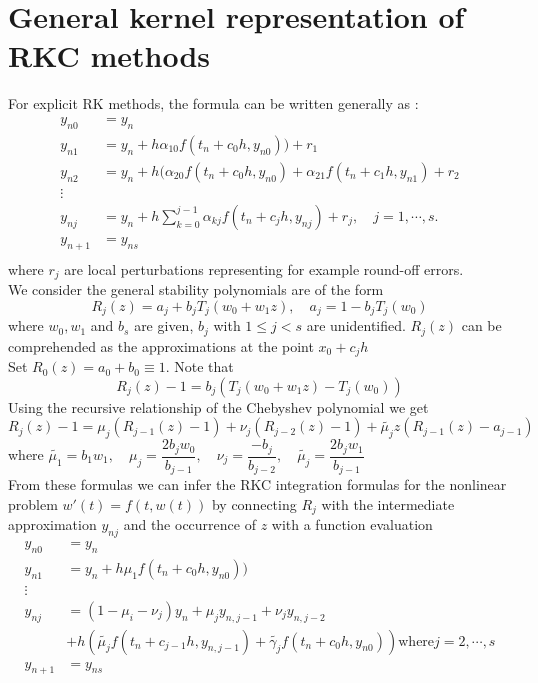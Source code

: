 \documentclass{article}
\theoremstyle{theorem}
\theoremstyle{definition}
\begin{document}
\section{General kernel representation of RKC methods}
For explicit RK methods, the formula can be written generally  as : $$ \begin{aligned}
y_{n0}&=y_n\\ 
y_{n1}&=y_n + h \alpha_{10}f(t_n+c_0h,y_{n0}))+r_1\\ 
y_{n2}&=y_n + h (\alpha_{20}f(t_n+c_0h,y_{n0})+\alpha_{21}f(t_n+c_1h,y_{n1})+r_2\\ 
\vdots \\
y_{nj}&=y_n + h \sum_{k=0}^{j-1}\alpha_{kj}f(t_n+c_jh,y_{nj})+r_j ,\quad j=1,\cdots, s. \\
y_{n+1}&=y_{ns}\\ 
\end{aligned}$$
where $r_j$ are local perturbations representing for example round-off errors.\\
We consider the general stability polynomials are of the form
$$R_j(z)=a_j+b_jT_j(w_0+w_1z), \quad a_j=1-b_jT_j(w_0)$$ where $w_0,w_1$ and $b_s$ are given, $b_j$ with $1 \le j < s$ are unidentified. $R_j(z)$ can be comprehended as the approximations at the point $x_0+c_jh$\\ Set $R_0(z)=a_0+b_0 \equiv 1$. 
Note that $$R_j(z)-1=b_j(T_j(w_0+w_1z)-T_j(w_0))$$
Using the recursive relationship of the Chebyshev polynomial we get
$$R_j(z)-1=\mu_j(R_{j-1}(z)-1)+\nu_j(R_{j-2}(z)-1)+\tilde{\mu_{j}}z(R_{j-1}(z)-a_{j-1})$$ where $\tilde{\mu_{1}} =b_1w_1, \quad \mu_j=\dfrac{2b_jw_0}{b_{j-1}}, \quad \nu_j=\dfrac{-b_j}{b_{j-2}},\quad \tilde{\mu_j}=\dfrac{2b_jw_1}{b_{j-1}}$ \\
From these formulas we can infer the RKC integration formulas for the nonlinear problem $w'(t) = f(t, w(t))$ by connecting $R_j$ with the intermediate approximation $y_{nj}$ and the occurrence of $z$ with a function evaluation
$$\begin{aligned}
y_{n0}&=y_n\\ 
y_{n1}&=y_n + h \mu_{1}f(t_n+c_0h,y_{n0}))\\ 
\vdots \\
y_{nj}&=(1-\mu_i-\nu_j)y_n+\mu_jy_{n,j-1}+\nu_j y_{n,j-2} \\ &+ h \left( \tilde{\mu_{j}}f(t_n+c_{j-1}h,y_{n,j-1}) +\tilde{\gamma_j}f(t_n+c_0h,y_{n0})\right ) \text{where} j=2, \cdots, s\\
y_{n+1}&=y_{ns}\\ 
\end{aligned}$$
\end{document}
